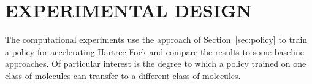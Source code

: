 \documentclass[twoside,11pt]{article}
\begin{document}

\section{EXPERIMENTAL DESIGN}\label{sec:exp}
The computational experiments use the approach of Section~\ref{sec:policy} to train a policy for accelerating Hartree-Fock and compare the results to some baseline approaches. Of particular interest is the degree to which a policy trained on one class of molecules can transfer to a different class of molecules.
\end{document}
